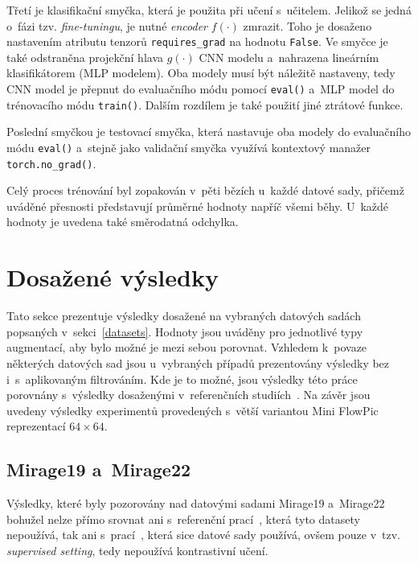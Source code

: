 Třetí je klasifikační smyčka, která je použita při učení s~učitelem. Jelikož se jedná o~fázi tzv. \textit{fine-tuningu}, je nutné \textit{encoder} $f(\cdot)$ zmrazit. Toho je dosaženo nastavením atributu tenzorů \texttt{requires\_grad} na hodnotu \texttt{False}. Ve smyčce je také odstraněna projekční hlava $g(\cdot)$ CNN modelu a~nahrazena lineárním klasifikátorem (MLP modelem). Oba modely musí být náležitě nastaveny, tedy CNN model je přepnut do evaluačního módu pomocí \texttt{eval()} a~MLP model do trénovacího módu \texttt{train()}. Dalším rozdílem je také použití jiné ztrátové funkce.

Poslední smyčkou je testovací smyčka, která nastavuje oba modely do evaluačního módu \texttt{eval()} a~stejně jako validační smyčka využívá kontextový manažer \texttt{torch.no\_grad()}.

Celý proces trénování byl zopakován v~pěti bězích u~každé datové sady, přičemž uváděné přesnosti představují průměrné hodnoty napříč všemi běhy. U~každé hodnoty je uvedena také směrodatná odchylka.

\section{Dosažené výsledky}
Tato sekce prezentuje výsledky dosažené na vybraných datových sadách popsaných v~sekci~\ref{datasets}. Hodnoty jsou uváděny pro jednotlivé typy augmentací, aby bylo možné je mezi sebou porovnat. Vzhledem k~povaze některých datových sad jsou u~vybraných případů prezentovány výsledky bez i~s~aplikovaným filtrováním. Kde je to možné, jsou výsledky této práce porovnány s~výsledky dosaženými v~referenčních studiích~\cite{flowpic_augmentations, huawei_paper}. Na závěr jsou uvedeny výsledky experimentů provedených s~větší variantou Mini FlowPic reprezentací $64\times64$.

\subsection{Mirage19 a~Mirage22}
Výsledky, které byly pozorovány nad datovými sadami Mirage19 a~Mirage22 bohužel nelze přímo srovnat ani s~referenční prací~\cite{flowpic_augmentations}, která tyto datasety nepoužívá, tak ani s~prací~\cite{huawei_paper}, která sice datové sady používá, ovšem pouze v~tzv. \textit{supervised setting}, tedy nepoužívá kontrastivní učení.

